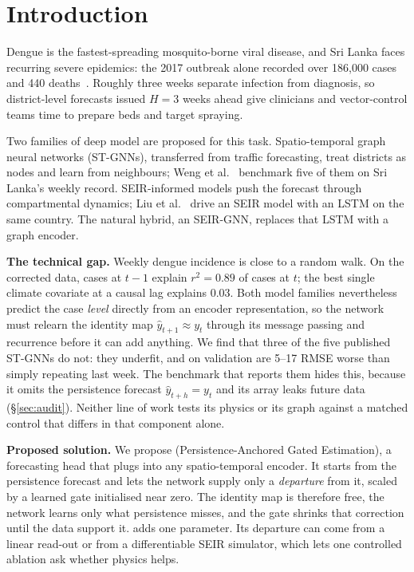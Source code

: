 \section{Introduction}
\label{sec:intro}

Dengue is the fastest-spreading mosquito-borne viral disease, and Sri Lanka
faces recurring severe epidemics: the 2017 outbreak alone recorded over 186{,}000
cases and 440 deaths~\cite{tissera2020severe}. Roughly three weeks separate
infection from diagnosis, so district-level forecasts issued $H=3$ weeks ahead
give clinicians and vector-control teams time to prepare beds and target spraying.

Two families of deep model are proposed for this task. Spatio-temporal graph
neural networks (ST-GNNs), transferred from traffic forecasting, treat districts
as nodes and learn from neighbours; Weng et al.~\cite{weng2024graph} benchmark five
of them on Sri Lanka's weekly record. SEIR-informed models push the forecast through
compartmental dynamics; Liu et al.~\cite{liu2025seirlstm} drive an SEIR model with an
LSTM on the same country. The natural hybrid, an SEIR-GNN, replaces that LSTM with a
graph encoder.

\textbf{The technical gap.} Weekly dengue incidence is close to a random walk. On the
corrected data, cases at $t-1$ explain $r^2=0.89$ of cases at $t$; the best single
climate covariate at a causal lag explains $0.03$. Both model families nevertheless
predict the case \emph{level} directly from an encoder representation, so the network
must relearn the identity map $\hat y_{t+1}\approx y_t$ through its message passing
and recurrence before it can add anything. We find that three of the five published
ST-GNNs do not: they underfit, and on validation are 5--17 RMSE worse than simply
repeating last week. The benchmark that reports them hides this, because it omits the persistence
forecast $\hat y_{t+h}=y_t$ and its array leaks future data
(\S\ref{sec:audit}). Neither line of work tests its physics or its graph against a
matched control that differs in that component alone.

\textbf{Proposed solution.} We propose \model{} (Persistence-Anchored Gated
Estimation), a forecasting head that plugs into any spatio-temporal encoder. It
starts from the persistence forecast and lets the network supply only a
\emph{departure} from it, scaled by a learned gate initialised near zero. The
identity map is therefore free, the network learns only what persistence misses,
and the gate shrinks that correction until the data support it. \model{} adds one
parameter. Its departure can come from a linear read-out or from a differentiable
SEIR simulator, which lets one controlled ablation ask whether physics helps.

